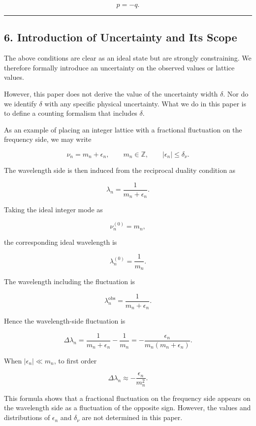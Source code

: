 \documentclass[
]{article}
\begin{document}
\[
p=-q .
\]

\begin{center}\rule{0.5\linewidth}{0.5pt}\end{center}

\subsection{6. Introduction of Uncertainty and Its
Scope}\label{introduction-of-uncertainty-and-its-scope}

The above conditions are clear as an ideal state but are strongly
constraining. We therefore formally introduce an uncertainty on the
observed values or lattice values.

However, this paper does not derive the value of the uncertainty width
\(\delta\). Nor do we identify \(\delta\) with any specific physical
uncertainty. What we do in this paper is to define a counting formalism
that includes \(\delta\).

As an example of placing an integer lattice with a fractional
fluctuation on the frequency side, we may write

\[
\nu_n=m_n+\epsilon_n,\qquad
m_n\in\mathbb{Z},\qquad
|\epsilon_n|\le \delta_\nu .
\]

The wavelength side is then induced from the reciprocal duality
condition as

\[
\lambda_n=\frac{1}{m_n+\epsilon_n} .
\]

Taking the ideal integer mode as

\[
\nu_n^{(0)}=m_n ,
\]

the corresponding ideal wavelength is

\[
\lambda_n^{(0)}=\frac{1}{m_n} .
\]

The wavelength including the fluctuation is

\[
\lambda_n^{\mathrm{obs}}=
\frac{1}{m_n+\epsilon_n} .
\]

Hence the wavelength-side fluctuation is

\[
\Delta\lambda_n
=
\frac{1}{m_n+\epsilon_n}
-
\frac{1}{m_n}
=
-\frac{\epsilon_n}{m_n(m_n+\epsilon_n)} .
\]

When \(|\epsilon_n|\ll m_n\), to first order

\[
\Delta\lambda_n\approx
-\frac{\epsilon_n}{m_n^2} .
\]

This formula shows that a fractional fluctuation on the frequency side
appears on the wavelength side as a fluctuation of the opposite sign.
However, the values and distributions of \(\epsilon_n\) and
\(\delta_\nu\) are not determined in this paper.
\end{document}
